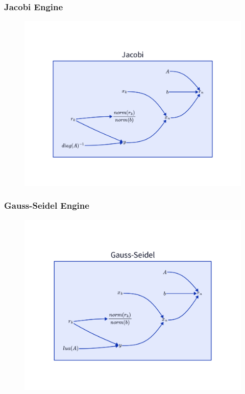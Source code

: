 \documentclass{beamer}
\begin{document}
\begin{frame}
\frametitle{Jacobi Engine}
\begin{figure}
  \centering
  \includegraphics[width=\linewidth]{images/cd-jae.png}
\end{figure}
\end{frame}

\begin{frame}
\frametitle{Gauss-Seidel Engine}
\begin{figure}
  \centering
  \includegraphics[width=\linewidth]{images/cd-gse.png}
\end{figure}
\end{frame}
\end{document}

